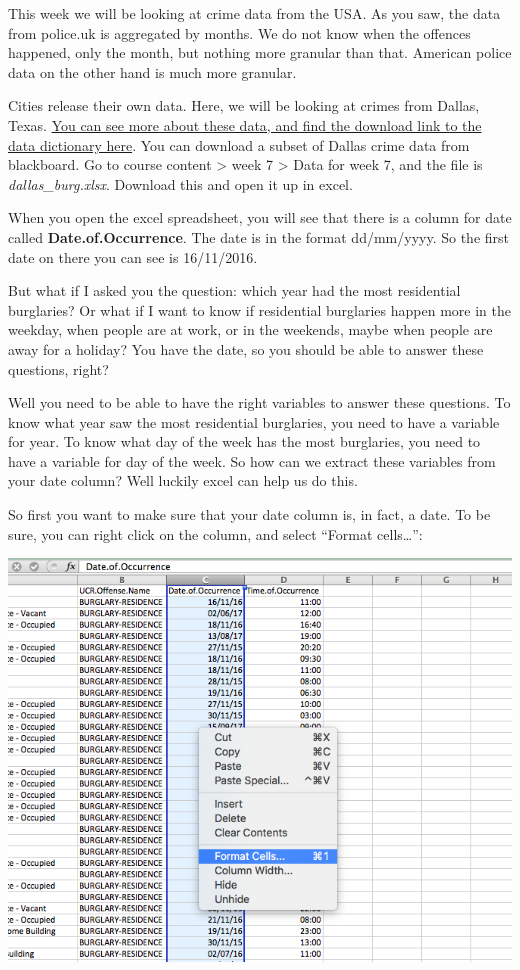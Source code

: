 \documentclass[]{book}
\theoremstyle{definition}
\theoremstyle{definition}
\theoremstyle{definition}
\theoremstyle{remark}
\begin{document}
This week we will be looking at crime data from the USA. As you saw, the
data from police.uk is aggregated by months. We do not know when the
offences happened, only the month, but nothing more granular than that.
American police data on the other hand is much more granular.

 Cities release their own data. Here, we will be looking at crimes from
Dallas, Texas.
\href{https://www.dallasopendata.com/Public-Safety/Police-Bulk-Data/ftja-9jxd}{You
can see more about these data, and find the download link to the data
dictionary here}. You can download a subset of Dallas crime data from
blackboard. Go to course content \textgreater{} week 7 \textgreater{}
Data for week 7, and the file is \emph{dallas\_burg.xlsx}. Download this
and open it up in excel.

When you open the excel spreadsheet, you will see that there is a column
for date called \textbf{Date.of.Occurrence}. The date is in the format
dd/mm/yyyy. So the first date on there you can see is 16/11/2016.

But what if I asked you the question: which year had the most
residential burglaries? Or what if I want to know if residential
burglaries happen more in the weekday, when people are at work, or in
the weekends, maybe when people are away for a holiday? You have the
date, so you should be able to answer these questions, right?

Well you need to be able to have the right variables to answer these
questions. To know what year saw the most residential burglaries, you
need to have a variable for year. To know what day of the week has the
most burglaries, you need to have a variable for day of the week. So how
can we extract these variables from your date column? Well luckily excel
can help us do this.

So first you want to make sure that your date column is, in fact, a
date. To be sure, you can right click on the column, and select ``Format
cells\ldots{}'':

\includegraphics{imgs/format_date_1.png}
\end{document}
